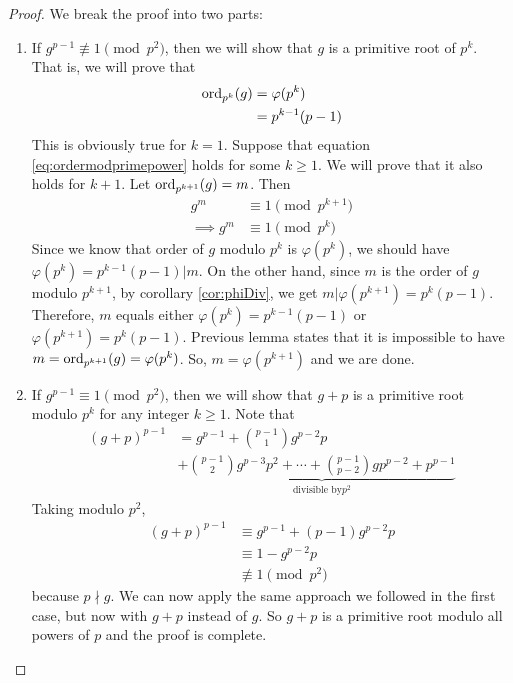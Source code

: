 \documentclass{subfile}
\begin{document}
	\begin{proof}
		We break the proof into two parts:
		\begin{enumerate}
			\item If $g^{p-1} \not \equiv 1 \pmod{p^2}$, then we will show that $g$ is a primitive root of $p^k$. That is, we will prove that
				\begin{align}\label{eq:ordermodprimepower}
					\operatorname{ord}_{p^k} (g)
						& =\varphi(p^k)\\
						& =p^{k-1}(p-1)
				\end{align}
			This is obviously true for $k=1$. Suppose that equation \eqref{eq:ordermodprimepower} holds for some $k\geq 1$. We will prove that it also holds for $k+1$. Let $\operatorname{ord}_{p^{k+1}} (g)=m$. Then
				\begin{align*}
					g^m
						& \equiv 1 \pmod{p^{k+1}}\\
					\implies g^m
						& \equiv 1 \pmod{p^{k}}
				\end{align*}
			Since we know that order of $g$ modulo $p^k$ is $\varphi(p^k)$, we should have $\varphi(p^k)=p^{k-1}(p-1)|m$. On the other hand, since $m$ is the order of $g$ modulo $p^{k+1}$, by corollary \eqref{cor:phiDiv}, we get $m|\varphi(p^{k+1})=p^k(p-1)$. Therefore, $m$ equals either $\varphi(p^k)=p^{k-1}(p-1)$ or $\varphi(p^{k+1})=p^{k}(p-1)$. Previous lemma states that it is impossible to have $m=\operatorname{ord}_{p^{k+1}} (g)=\varphi(p^k)$. So, $m=\varphi(p^{k+1})$ and we are done.

			\item If $g^{p-1} \equiv 1 \pmod{p^2}$, then we will show that $g+p$ is a primitive root modulo $p^k$ for any integer $k\geq 1$. Note that
				\begin{align*}
					(g+p)^{p-1}
						& = g^{p-1} + \binom{p-1}{1} g^{p-2}p \\
						& + \underbrace{\binom{p-1}{2}g^{p-3}p^2+\cdots + \binom{p-1}{p-2} gp^{p-2} + p^{p-1}}_{\mbox{divisible by} p^2}
				\end{align*}
			Taking modulo $p^2$,
				\begin{align*}
					(g+p)^{p-1}
						& \equiv g^{p-1}+(p-1)g^{p-2}p\\
						& \equiv 1 - g^{p-2}p\\
						& \not \equiv 1 \pmod{p^2}
				\end{align*}
			because $p \nmid g$. We can now apply the same approach we followed in the first case, but now with $g+p$ instead of $g$. So $g+p$ is a primitive root modulo all powers of $p$ and the proof is complete.
		\end{enumerate}
	\end{proof}
\end{document}
